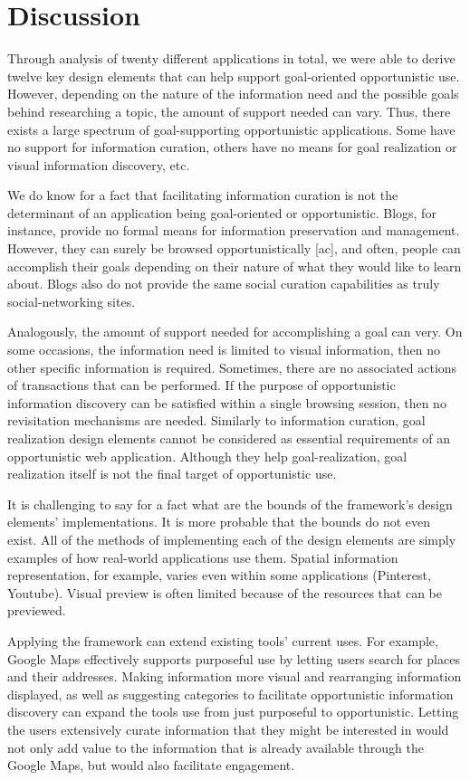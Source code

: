 \documentclass{casconpaper}
\begin{document}
{\section{Discussion}
Through analysis of twenty different applications in total, we were able to derive twelve key design elements that can help support goal-oriented opportunistic use.  However, depending on the nature of the information need and the possible goals behind researching a topic, the amount of support needed can vary. Thus, there exists a large spectrum of goal-supporting opportunistic applications.  Some have no support for information curation, others have no means for goal realization or visual information discovery, etc.

We do know for a fact that facilitating information curation is not the determinant of an application being goal-oriented or opportunistic. Blogs, for instance, provide no formal means for information preservation and management. However, they can surely be browsed opportunistically [ac], and often, people can accomplish their goals depending on their nature of what they would like to learn about. Blogs also do not provide the same social curation capabilities as truly social-networking sites. 

Analogously, the amount of support needed for accomplishing a goal can very. On some occasions, the information need is limited to visual information, then no other specific information is required. Sometimes, there are no associated actions of transactions that can be performed.  If the purpose of opportunistic information discovery can be satisfied within a single browsing session, then no revisitation mechanisms are needed. Similarly to information curation, goal realization design elements cannot be considered as essential requirements of an opportunistic web application. Although they help goal-realization, goal realization itself is not the final target of opportunistic use. 

It is challenging to say for a fact what are the bounds of the framework’s design elements’ implementations. It is more probable that the bounds do not even exist. All of the methods of implementing each of the design elements are simply examples of how real-world applications use them. Spatial information representation, for example, varies even within some applications (Pinterest, Youtube). Visual preview is often limited because of the resources that can be previewed.

Applying the framework can extend existing tools’ current uses. For example, Google Maps effectively supports purposeful use by letting users search for places and their addresses. Making information more visual and rearranging information displayed, as well as suggesting categories to facilitate opportunistic information discovery can expand the tools use from just purposeful to opportunistic. Letting the users extensively curate information that they might be interested in would not only add value to the information that is already available through the Google Maps, but would also facilitate engagement. 

}
\end{document}
